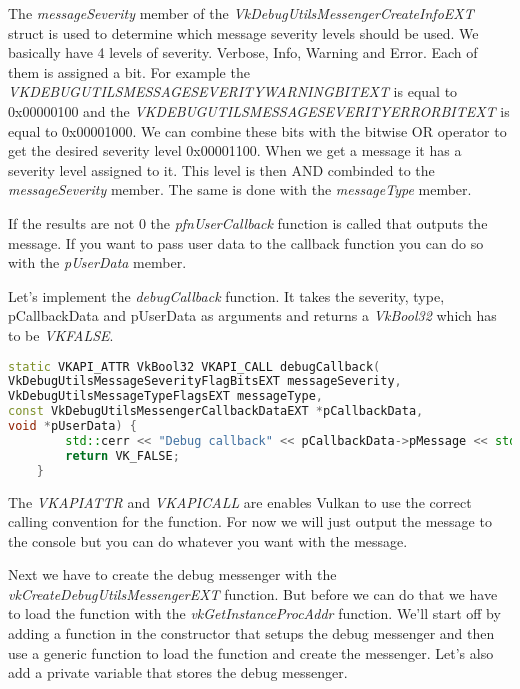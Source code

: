 \documentclass[12pt]{report} \usepackage{preamble}
\begin{document}
The \textit{messageSeverity} member of the \textit{VkDebugUtilsMessengerCreateInfoEXT} struct
is used to determine which message severity levels should be used. We basically have 4 levels of
severity. Verbose, Info, Warning and Error. Each of them is assigned a bit. For example the
\textit{VK\textunderscore DEBUG\textunderscore UTILS\textunderscore MESSAGE\textunderscore SEVERITY\textunderscore WARNING\textunderscore BIT\textunderscore EXT}
is equal to 0x00000100 and the \textit{VK\textunderscore DEBUG\textunderscore UTILS\textunderscore MESSAGE\textunderscore SEVERITY\textunderscore ERROR\textunderscore BIT\textunderscore EXT}
is equal to 0x00001000. We can combine these bits with the bitwise OR operator to get the desired severity level
0x00001100. When we get a message it has a severity level assigned to it. This level is then AND combinded to the
\textit{messageSeverity} member. The same is done with the \textit{messageType} member.

If the results are not 0 the \textit{pfnUserCallback} function is called that
outputs the message.  If you want to pass user data to the callback function you can do so with the
\textit{pUserData} member.

Let's implement the \textit{debugCallback} function.
It takes the severity, type, pCallbackData and pUserData as arguments and returns a \textit{VkBool32}
which has to be \textit{VK\textunderscore FALSE}.

\begin{lstlisting}[language=C++]
static VKAPI_ATTR VkBool32 VKAPI_CALL debugCallback(
VkDebugUtilsMessageSeverityFlagBitsEXT messageSeverity,
VkDebugUtilsMessageTypeFlagsEXT messageType,
const VkDebugUtilsMessengerCallbackDataEXT *pCallbackData,
void *pUserData) {
		std::cerr << "Debug callback" << pCallbackData->pMessage << std::endl;
		return VK_FALSE;
	}
\end{lstlisting}

The \textit{VKAPI\textunderscore ATTR} and \textit{VKAPI\textunderscore CALL} are enables Vulkan to
use the correct calling convention for the function. For now we will just output the message to the
console but you can do whatever you want with the message.

Next we have to create the debug messenger with the \textit{vkCreateDebugUtilsMessengerEXT} function.
But before we can do that we have to load the function with the \textit{vkGetInstanceProcAddr} function.
We'll start off by adding a function in the constructor that setups the debug messenger and then
use a generic function to load the function and create the messenger. Let's also add a private
variable that stores the debug messenger.
\end{document}
